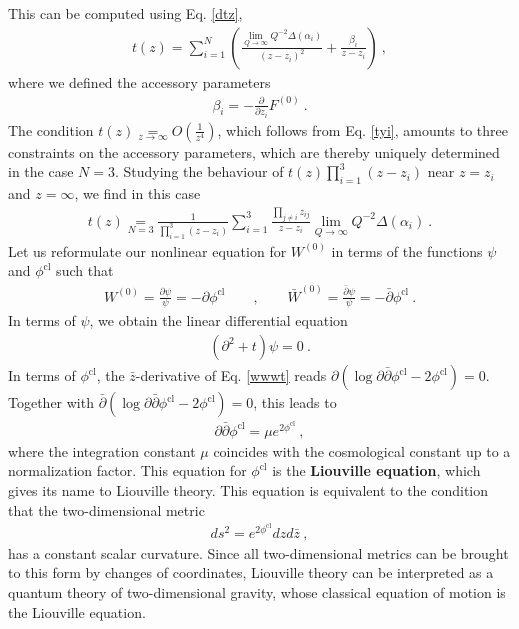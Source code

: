 \documentclass[12pt, a4paper, notitlepage, twoside]{report}
\numberwithin{equation}{section}
\theoremstyle{break}
\begin{document}
This can be computed using Eq. \eqref{dtz}, 
\begin{align}
 t(z) = \sum_{i=1}^N \left( \frac{\underset{Q\to\infty}{\lim} Q^{-2}\Delta(\alpha_i)}{(z-z_i)^2} + \frac{\beta_i}{z-z_i} \right)\ ,
\label{tzs}
\end{align}
where we defined the accessory parameters
\begin{align}
 \beta_i = -{\frac{\partial}{\partial z_i}} F^{(0)}\ .
\end{align}
The condition $t(z) \underset{z\to \infty}{=} O(\frac{1}{z^4})$, which follows from Eq. \eqref{tyi}, amounts to three constraints on the accessory parameters, which are thereby uniquely determined in the case $N= 3$. Studying the behaviour of $t(z)\prod_{i=1}^3(z-z_i)$ near $z=z_i$ and $z=\infty$, we find in this case
\begin{align}
 t(z) \underset{N=3}{=} \frac{1}{\prod_{i=1}^3(z-z_i)} \sum_{i=1}^3 \frac{\prod_{j\neq i} z_{ij}}{z-z_i}\underset{Q\to\infty}{\lim} Q^{-2}\Delta(\alpha_i)\ .
\end{align}
Let us reformulate our nonlinear equation for $W^{(0)}$ in terms of the functions $\psi$ and $\phi^\text{cl}$ such that
\begin{align}
 W^{(0)} = \frac{\partial\psi}{\psi} = -\partial \phi^\text{cl} \qquad , \qquad \bar W^{(0)} = \frac{\bar\partial\psi}{\psi}= -\bar\partial \phi^\text{cl}\ .
\end{align}
In terms of $\psi$, we obtain the linear differential equation
\begin{align}
 \boxed{ (\partial^2 + t ) \psi = 0 } \ .
 \label{dtp}
\end{align}
In terms of $\phi^\text{cl}$, the $\bar{z}$-derivative of Eq. \eqref{wwwt} reads $\partial\left(\log \partial\bar{\partial}\phi^\text{cl} -2\phi^\text{cl}\right)=0$. Together with $\bar{\partial} \left(\log \partial\bar{\partial}\phi^\text{cl} -2\phi^\text{cl}\right)=0$, this leads to 
\begin{align}
 \partial\bar{\partial}\phi^\text{cl} = \mu e^{2\phi^\text{cl}}\ ,
 \label{phieq}
\end{align}
where the integration constant $\mu$ coincides with the cosmological constant up to a normalization factor.
This equation for $\phi^\text{cl}$ is the \textbf{\boldmath Liouville equation}, which gives its name to Liouville theory.
This equation is equivalent to the condition that the two-dimensional metric
\begin{align}
 ds^2 = e^{2\phi^\text{cl}} dz d\bar{z}\ ,
\end{align}
has a constant scalar curvature.
Since all two-dimensional metrics can be brought to this form by changes of coordinates, Liouville theory can be interpreted as a quantum theory of two-dimensional gravity, whose classical equation of motion is the Liouville equation.
\end{document}
